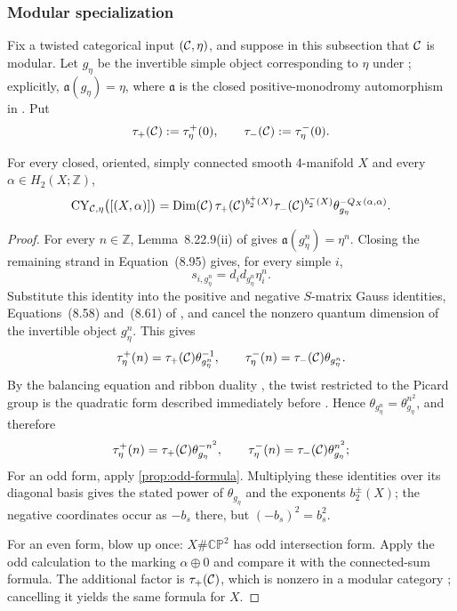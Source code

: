 \subsubsection{Modular specialization}
\label{subsec:modular-specialization}

Fix a twisted categorical input \((\mathcal{C},\eta)\), and suppose in this
subsection that $\mathcal{C}$ is modular.  Let $g_\eta$ be the invertible simple
object corresponding to $\eta$ under
\cite[Lemma~8.22.9(iii)]{EGNO2015}; explicitly,
$\mathfrak a(g_\eta)=\eta$, where $\mathfrak a$ is the closed
positive-monodromy
automorphism in \cite[Equation~(8.95)]{EGNO2015}.  Put
\[
  \tau_+(\mathcal{C}):=\tau_\eta^+(0),
  \qquad
  \tau_-(\mathcal{C}):=\tau_\eta^-(0).
\]

\begin{theorem}
\label{prop:modular-formula}
For every closed, oriented, simply connected smooth 4-manifold $X$ and
every $\alpha\in H_2(X;\mathbb Z)$,
\[
  \operatorname{CY}_{\mathcal{C},\eta}\bigl([(X,\alpha)]\bigr)
  =\operatorname{Dim}(\mathcal{C})\,
   \tau_+(\mathcal{C})^{b_2^+(X)}
   \tau_-(\mathcal{C})^{b_2^-(X)}
   \theta_{g_\eta}^{-Q_X(\alpha,\alpha)}.
\]
\end{theorem}

\begin{proof}
For every $n\in\mathbb Z$, Lemma~8.22.9(ii) of \cite{EGNO2015} gives
$\mathfrak a(g_\eta^n)=\eta^n$.  Closing the remaining strand in
Equation~(8.95) gives, for every simple $i$,
\[
  s_{i,g_\eta^n}=d_i d_{g_\eta^n}\eta_i^n.
\]
Substitute this identity into the positive and negative $S$-matrix Gauss
identities, Equations~(8.58) and~(8.61) of \cite{EGNO2015}, and cancel the
nonzero quantum dimension of the invertible object $g_\eta^n$.  This gives
\[
  \tau_\eta^+(n)=\tau_+(\mathcal{C})\theta_{g_\eta^n}^{-1},
  \qquad
  \tau_\eta^-(n)=\tau_-(\mathcal{C})\theta_{g_\eta^n}.
\]
By the balancing equation and ribbon duality
\cite[Definition~8.10.1]{EGNO2015}, the twist restricted to the Picard group
is the quadratic form described immediately before
\cite[Definition~8.4.1]{EGNO2015}.  Hence
$\theta_{g_\eta^n}=\theta_{g_\eta}^{n^2}$, and therefore
\[
  \tau_\eta^+(n)=\tau_+(\mathcal{C})\theta_{g_\eta}^{-n^2},
  \qquad
  \tau_\eta^-(n)=\tau_-(\mathcal{C})\theta_{g_\eta}^{n^2};
\]
For an odd form, apply \cref{prop:odd-formula}.  Multiplying these identities
over its diagonal basis gives the stated power of $\theta_{g_\eta}$ and the
exponents $b_2^\pm(X)$; the negative coordinates occur as $-b_s$ there, but
$(-b_s)^2=b_s^2$.

For an even form, blow up once: $X\#\mathbb{CP}^2$ has odd intersection
form.  Apply the odd calculation to the marking $\alpha\oplus0$ and compare
it with the connected-sum formula.  The additional factor is
$\tau_+(\mathcal{C})$, which is nonzero in a modular category
\cite[Proposition~8.15.4]{EGNO2015}; cancelling it yields the same formula
for $X$.
\end{proof}


